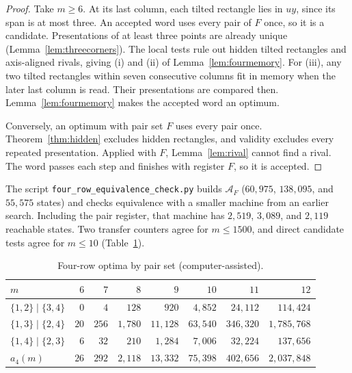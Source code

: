 \begin{proof}
Take $m\ge6$. At its last column, each tilted rectangle lies in $uy$, since its span is at most three.
An accepted word uses every pair of $F$ once, so it is a candidate.
Presentations of at least three points are already unique
(Lemma~\ref{lem:threecorners}). The local tests rule out hidden
tilted rectangles and axis-aligned rivals, giving (i) and (ii) of
Lemma~\ref{lem:fourmemory}. For (iii), any two tilted rectangles within
seven consecutive columns fit in memory when the later last column is read.
Their presentations are compared then. Lemma~\ref{lem:fourmemory} makes the accepted word an optimum.

Conversely, an optimum with pair set $F$ uses every pair once. Theorem~\ref{thm:hidden} excludes hidden rectangles, and validity
excludes every repeated presentation. Applied with $F$,
Lemma~\ref{lem:rival} cannot find a rival. The word passes each step
and finishes with register $F$, so it is accepted.
\end{proof}

The script \nolinkurl{four_row_equivalence_check.py} builds $\mathcal A_F$
($60{,}975$, $138{,}095$, and $55{,}575$ states) and checks equivalence with
a smaller machine from an earlier search. Including the pair register,
that machine has $2{,}519$, $3{,}089$, and $2{,}119$ reachable states.
Two transfer counters agree for $m\le1500$, and direct candidate tests agree
for $m\le10$ (Table~\ref{tab:fourvalues}).

\begin{table}[!htb]
\centering\scriptsize\setlength{\tabcolsep}{4pt}
\begin{tabular}{@{}lrrrrrrr@{}}
\toprule
$m$ & $6$ & $7$ & $8$ & $9$ & $10$ & $11$ & $12$\\
\midrule
$\{1,2\}\mid\{3,4\}$ & $0$ & $4$ & $128$ & $920$ & $4{,}852$ & $24{,}112$ & $114{,}424$\\
$\{1,3\}\mid\{2,4\}$ & $20$ & $256$ & $1{,}780$ & $11{,}128$ & $63{,}540$ & $346{,}320$ & $1{,}785{,}768$\\
$\{1,4\}\mid\{2,3\}$ & $6$ & $32$ & $210$ & $1{,}284$ & $7{,}006$ & $32{,}224$ & $137{,}656$\\
$a_4(m)$ & $26$ & $292$ & $2{,}118$ & $13{,}332$ & $75{,}398$ & $402{,}656$ & $2{,}037{,}848$\\
\bottomrule
\end{tabular}
\caption{Four-row optima by pair set (computer-assisted).}
\label{tab:fourvalues}
\end{table}

